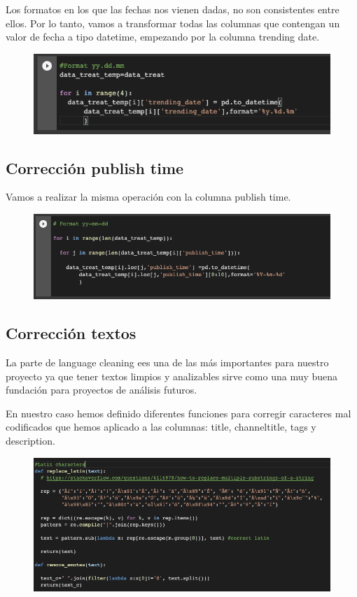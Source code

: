 \documentclass[a4paper,12pt]{article}
\begin{document}
Los formatos en los que las fechas nos vienen dadas, no son consistentes entre ellos. Por lo tanto, vamos a transformar todas las columnas que contengan un valor de fecha a tipo datetime, empezando por la columna trending date.

\begin{figure}[h!]
 \centering
\includegraphics[width=13cm]{correc_trending.png}
\end{figure}

\subsection{Correcci\'on  publish time}
Vamos a realizar la misma operaci\'on con la columna publish time.

\begin{figure}[h!]
\centering
\includegraphics[width=13cm]{correc_publish.png}
\end{figure}

\subsection{Correcci\'on  textos}
La parte de language cleaning ees una de las m\'as importantes para nuestro proyecto ya que tener textos limpios y analizables sirve como una muy buena fundaci\'on para proyectos de an\'alisis futuros.


En nuestro caso hemos definido diferentes funciones para corregir caracteres mal codificados que hemos aplicado a las columnas: title, channel{\textunderscore}title,  tags y description.

\begin{figure}[h!]
\centering
\includegraphics[width=13cm]{latin_characters.png}
\end{figure}
\end{document}
